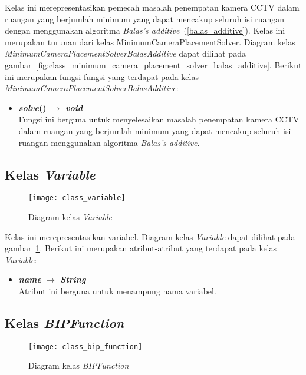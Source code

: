 Kelas ini merepresentasikan pemecah masalah penempatan kamera CCTV dalam ruangan yang berjumlah minimum yang dapat mencakup seluruh isi ruangan dengan menggunakan algoritma \textit{Balas's additive}~(\ref{balas_additive}). Kelas ini merupakan turunan dari kelas MinimumCameraPlacementSolver. Diagram kelas \textit{MinimumCameraPlacementSolverBalasAdditive} dapat dilihat pada gambar~\ref{fig:class_minimum_camera_placement_solver_balas_additive}. Berikut ini merupakan fungsi-fungsi yang terdapat pada kelas \textit{MinimumCameraPlacementSolverBalasAdditive}:
\begin{itemize}
	\item \textbf{\textit{solve}() \(\rightarrow\) \textit{void}}\\
	Fungsi ini berguna untuk menyelesaikan masalah penempatan kamera CCTV dalam ruangan yang berjumlah minimum yang dapat mencakup seluruh isi ruangan menggunakan algoritma \textit{Balas's additive}.
\end{itemize}

\subsection{Kelas \textit{Variable}}
\begin{figure}[H]
	\centering  
	\texttt{[image: class\_variable]}
	\caption[Diagram kelas \textit{Variable}]{Diagram kelas \textit{Variable}}
	\label{fig:class_variable}
\end{figure}

Kelas ini merepresentasikan variabel. Diagram kelas \textit{Variable} dapat dilihat pada gambar~\ref{fig:class_variable}. Berikut ini merupakan atribut-atribut yang terdapat pada kelas \textit{Variable}:
\begin{itemize}
	\item \textbf{\textit{name} $\rightarrow$ \textit{String}}\\
	Atribut ini berguna untuk menampung nama variabel.
\end{itemize}

\subsection{Kelas \textit{BIPFunction}}
\begin{figure}[H]
	\centering  
	\texttt{[image: class\_bip\_function]}
	\caption[Diagram kelas \textit{BIPFunction}]{Diagram kelas \textit{BIPFunction}}
	\label{fig:class_bip_function}
\end{figure}

